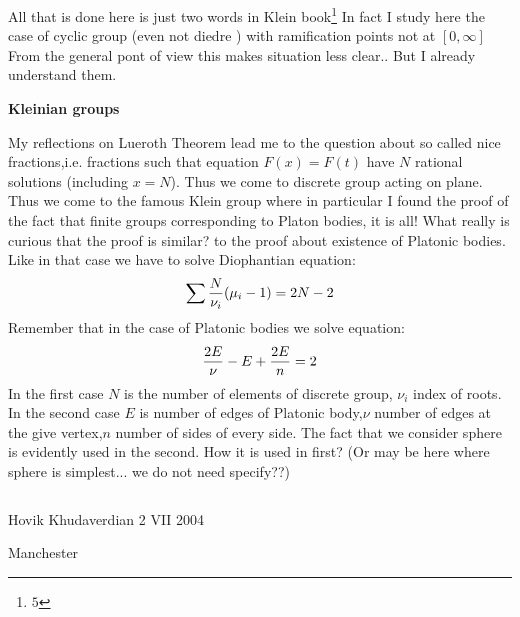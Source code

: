        All that is done here  is just two words in Klein book\footnote{$5$}
       {In fact I study here the case of cyclic group (even not diedre )
       with ramification points not at $[0,\infty]$ From the general pont of view this
       makes situation less clear.}.
       But I already understand them.

\bigskip

            \centerline {\bf Kleinian groups}

\bigskip
 My reflections on Lueroth Theorem lead me to  the question about so called
 nice fractions,i.e. fractions such that equation $F(x)=F(t)$ have
 $N$ rational solutions (including $x=N$). Thus we come to discrete group
 acting on plane. Thus we come to the famous Klein group where in particular
 I found the proof of the fact that finite groups corresponding to Platon bodies,
 it is all! What really is curious that the proof is similar? to the proof about
 existence of Platonic bodies.  Like in that case we have to solve Diophantian
  equation:
                      $$
              \sum{N\over \nu_i}(\mu_i-1)=2N-2
                        $$
Remember that in the case of Platonic bodies we solve equation:
                     $$
           {2E\over \nu}-E+{2E\over n}=2
                       $$
In the first case $N$ is the number of elements of discrete group, $\nu_i$ index of
roots. In the second case $E$ is number of edges of Platonic body,$\nu$ number of edges
at the give vertex,$n$ number of sides of every side. The fact that we consider sphere
is evidently used in the second. How it is used in first? (Or may be here where sphere
is simplest... we do not need specify??)



$$ $$




                      Hovik Khudaverdian
                                  2  VII 2004

                                   Manchester











\bye
